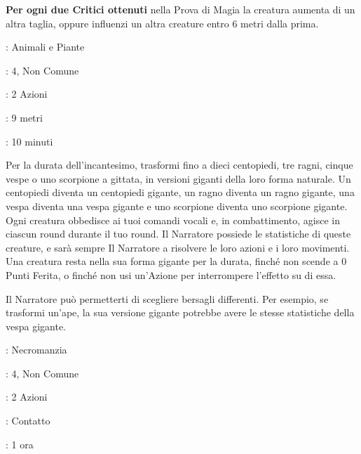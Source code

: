 \begin{multicols}{2}
\textbf{Per ogni due Critici ottenuti} nella Prova di Magia la creatura aumenta di un altra taglia, oppure influenzi un altra creature entro 6 metri dalla prima.

\noindent\colorbox{OBSSgold!10}{
\begin{minipage}{0.95\linewidth}
\begin{description}[noitemsep, topsep=0pt, parsep=0pt, partopsep=0pt, leftmargin=0cm, labelwidth=1.3cm]
	\item[\textbf{Lista}]: Animali e Piante
	\item[\textbf{Livello}]: 4, Non Comune
	\item[\textbf{Lancio}]: 2 Azioni
	\item[\textbf{Gittata}]: 9 metri
	\item[\textbf{Durata}]: 10 minuti
\end{description}
\end{minipage}}\smallskip

Per la durata dell'incantesimo, trasformi fino a dieci centopiedi, tre ragni, cinque vespe o uno scorpione a gittata, in versioni giganti della loro forma naturale. Un centopiedi diventa un centopiedi gigante, un ragno diventa un ragno gigante, una vespa diventa una vespa gigante e uno scorpione diventa uno scorpione gigante. Ogni creatura obbedisce ai tuoi comandi vocali e, in combattimento, agisce in ciascun round durante il tuo round. Il Narratore possiede le statistiche di queste creature, e sarà sempre Il Narratore a risolvere le loro azioni e i loro movimenti. Una creatura resta nella sua forma gigante per la durata, finché non scende a 0 Punti Ferita, o finché non usi un'Azione per interrompere l'effetto su di essa.

Il Narratore può permetterti di scegliere bersagli differenti. Per esempio, se trasformi un'ape, la sua versione gigante potrebbe avere le stesse statistiche della vespa gigante.

\noindent\colorbox{OBSSgold!10}{
\begin{minipage}{0.95\linewidth}
\begin{description}[noitemsep, topsep=0pt, parsep=0pt, partopsep=0pt, leftmargin=0cm, labelwidth=1.3cm]
	\item[\textbf{Lista}]: Necromanzia
	\item[\textbf{Livello}]: 4, Non Comune
	\item[\textbf{Lancio}]: 2 Azioni
	\item[\textbf{Gittata}]: Contatto
	\item[\textbf{Durata}]: 1 ora
\end{description}
\end{minipage}}\smallskip


\end{multicols}
